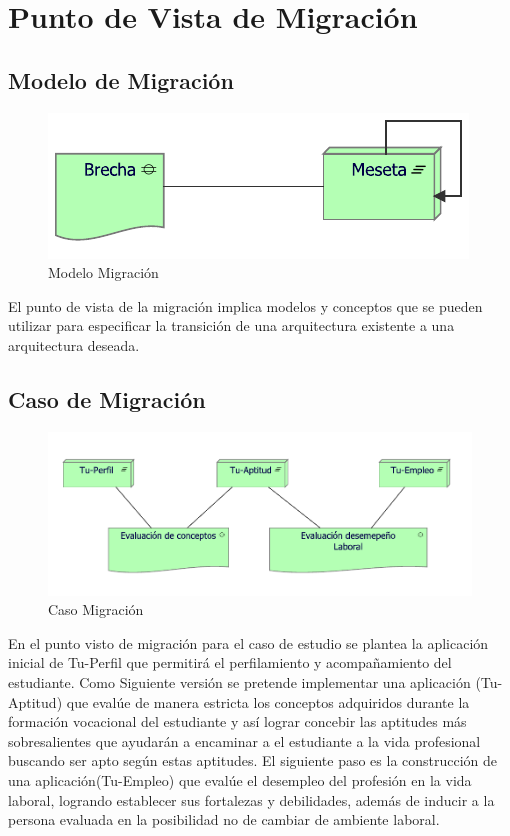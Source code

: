 \section{Punto de Vista de Migración}
\subsection{Modelo de Migración}
\begin{figure}[h!]
	\centering
	\includegraphics[width=.9\linewidth]{imgs/modelo/Migracion.pdf}
	\caption{Modelo Migración}
\end{figure}
El punto de vista de la migración implica modelos y conceptos que se pueden utilizar para especificar la transición de una arquitectura existente a una arquitectura deseada.

\subsection{Caso  de Migración}
\begin{figure}[h!]
	\centering
	\includegraphics[width=.9\linewidth]{imgs/caso/proyecto/migracion.pdf}
	\caption{Caso Migración}
\end{figure}
En el punto visto de migración para el caso de estudio se plantea la aplicación inicial de Tu-Perfil que permitirá el perfilamiento y acompañamiento del estudiante. Como Siguiente versión se pretende implementar una aplicación (Tu-Aptitud) que evalúe de manera estricta los conceptos adquiridos durante la formación vocacional del estudiante y así lograr concebir las aptitudes más sobresalientes que ayudarán a encaminar a el estudiante a la vida profesional buscando ser apto según estas aptitudes. El siguiente paso es la construcción de una aplicación(Tu-Empleo) que evalúe el desempleo del profesión en la vida laboral, logrando establecer sus fortalezas y debilidades, además de inducir a la persona evaluada en la posibilidad no de cambiar de ambiente  laboral.